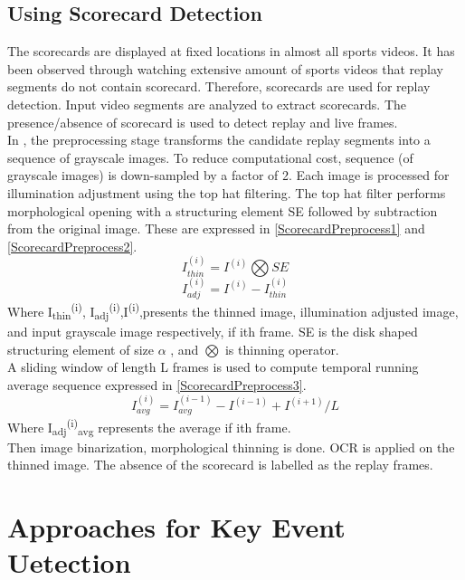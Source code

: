 \subsection{Using Scorecard Detection}
The scorecards are displayed at fixed locations in almost all sports videos. It has been observed through watching extensive amount of sports videos that replay segments do not contain scorecard. Therefore, scorecards are used for replay detection. Input video segments are analyzed to extract scorecards. The presence/absence of scorecard is used to detect replay and live frames.\\In \cite{7479531}, the preprocessing stage transforms the candidate replay segments into a sequence of grayscale images. To reduce computational cost, sequence (of grayscale images) is down-sampled by a factor of 2. Each image is processed for illumination adjustment using the top hat filtering. The top hat filter performs morphological opening with a structuring element SE followed by subtraction from the original image. These are expressed in \ref{ScorecardPreprocess1} and \ref{ScorecardPreprocess2}.
\begin{equation}
\label{ScorecardPreprocess1}
I^{(i)}_{thin}=I^{(i)}\bigotimes SE
\end{equation}
\begin{equation}
\label{ScorecardPreprocess2}
I^{(i)}_{adj}=I^{(i)}-I^{(i)}_{thin}
\end{equation}
Where I\textsubscript{thin}\textsuperscript{(i)}, I\textsubscript{adj}\textsuperscript{(i)},I\textsuperscript{(i)},presents the thinned image, illumination adjusted image, and input grayscale image respectively, if ith frame. SE is the disk shaped structuring element of size $\alpha$ , and $\bigotimes$ is thinning operator. \\A sliding window of length L frames is used to compute temporal running average sequence expressed in \ref{ScorecardPreprocess3}.
\begin{equation}
\label{ScorecardPreprocess3}
I^{(i)}_{avg}=I^{(i-1)}_{avg}-I^{(i-1)}+I^{(i+1)}/L
\end{equation}
Where I\textsubscript{adj}\textsuperscript{(i)}\textsubscript{avg} represents the average if ith frame.\\
Then image binarization, morphological thinning is done. OCR is applied on the thinned image. The absence of the scorecard is labelled as the replay frames.
\section{Approaches for Key Event Uetection}
